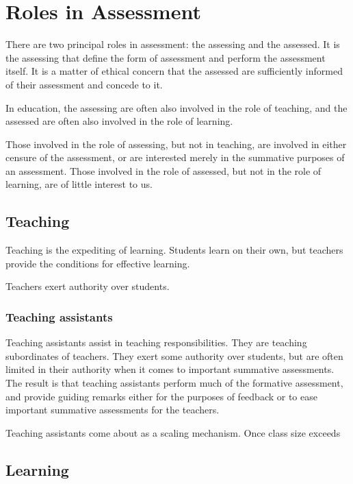 
\section{Roles in Assessment}

There are two principal roles in assessment: the assessing and the assessed.
It is the assessing that define the form of assessment and perform the
assessment itself. It is a matter of ethical concern that the assessed are
sufficiently informed of their assessment and concede to it.

In education, the assessing are often also involved in the role of teaching,
and the assessed are often also involved in the role of learning.

Those involved in the role of assessing, but not in teaching, are involved in
either censure of the assessment, or are interested merely in the summative
purposes of an assessment. Those involved in the role of assessed, but not in
the role of learning, are of little interest to us.

\subsection{Teaching}

Teaching is the expediting of learning. Students learn on their own, but
teachers provide the conditions for effective learning\cite{skinner-1965}.

Teachers exert authority over students.

\subsubsection{Teaching assistants}

Teaching assistants assist in teaching responsibilities. They are teaching
subordinates of teachers. They exert some authority over students, but are
often limited in their authority when it comes to important summative
assessments. The result is that teaching assistants perform much of the
formative assessment, and provide guiding remarks either for the purposes of
feedback or to ease important summative assessments for the teachers.

Teaching assistants come about as a scaling mechanism. Once class size exceeds 


\subsection{Learning}

